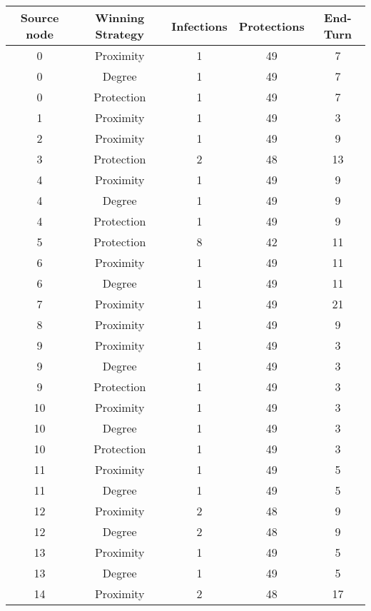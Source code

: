\documentclass[results.tex]{subfiles}
\begin{document}
\begin{center}
  \begin{tabular}{| c || c | c | c | c |}
    \hline
    {\bfseries Source node} & {\bfseries Winning Strategy} & {\bfseries Infections} & {\bfseries Protections} & {\bfseries End-Turn} \\  %
    \hline\hline
    0 & Proximity & 1 & 49 & 7 \\ 
    \hline
    0 & Degree & 1 & 49 & 7 \\ 
    \hline
    0 & Protection & 1 & 49 & 7 \\ 
    \hline
    1 & Proximity & 1 & 49 & 3 \\ 
    \hline
    2 & Proximity & 1 & 49 & 9 \\ 
    \hline
    3 & Protection & 2 & 48 & 13 \\ 
    \hline
    4 & Proximity & 1 & 49 & 9 \\ 
    \hline
    4 & Degree & 1 & 49 & 9 \\ 
    \hline
    4 & Protection & 1 & 49 & 9 \\ 
    \hline
    5 & Protection & 8 & 42 & 11 \\ 
    \hline
    6 & Proximity & 1 & 49 & 11 \\ 
    \hline
    6 & Degree & 1 & 49 & 11 \\ 
    \hline
    7 & Proximity & 1 & 49 & 21 \\ 
    \hline
    8 & Proximity & 1 & 49 & 9 \\ 
    \hline
    9 & Proximity & 1 & 49 & 3 \\ 
    \hline
    9 & Degree & 1 & 49 & 3 \\ 
    \hline
    9 & Protection & 1 & 49 & 3 \\ 
    \hline
    10 & Proximity & 1 & 49 & 3 \\ 
    \hline
    10 & Degree & 1 & 49 & 3 \\ 
    \hline
    10 & Protection & 1 & 49 & 3 \\ 
    \hline
    11 & Proximity & 1 & 49 & 5 \\ 
    \hline
    11 & Degree & 1 & 49 & 5 \\ 
    \hline
    12 & Proximity & 2 & 48 & 9 \\ 
    \hline
    12 & Degree & 2 & 48 & 9 \\ 
    \hline
    13 & Proximity & 1 & 49 & 5 \\ 
    \hline
    13 & Degree & 1 & 49 & 5 \\ 
    \hline
    14 & Proximity & 2 & 48 & 17 \\ 

\end{tabular}
\end{center}
\end{document}

